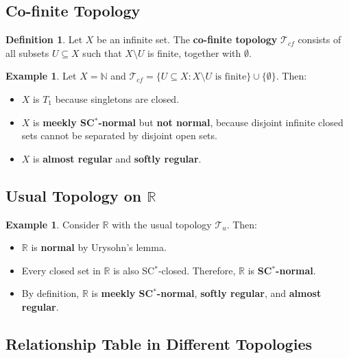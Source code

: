 \documentclass[12pt,a4paper,twoside]{report}  %
\theoremstyle{plain}
\theoremstyle{definition}
\newtheorem{definition}[theorem]{Definition}
\newtheorem{example}[theorem]{Example}
\begin{document}
\subsection{Co-finite Topology}

\begin{definition}
Let $X$ be an infinite set. The \textbf{co-finite topology}\cite{steen1978counterexamples,engelking1977general} $\mathcal{T}_{cf}$ consists of all subsets $U \subseteq X$ such that $X \setminus U$ is finite, together with $\emptyset$.
\end{definition}

\begin{example}
Let $X = \mathbb{N}$ and $\mathcal{T}_{cf} = \{ U \subseteq X : X \setminus U \text{ is finite} \} \cup \{\emptyset\}$. Then:
\begin{itemize}
    \item $X$ is $T_1$ because singletons are closed.
    \item $X$ is \textbf{meekly SC$^*$-normal} but \textbf{not normal}, because disjoint infinite closed sets cannot be separated by disjoint open sets.
    \item $X$ is \textbf{almost regular} and \textbf{softly regular}.
\end{itemize}
\end{example}

\subsection{Usual Topology on \texorpdfstring{$\mathbb{R}$}{R}}

\begin{example}
Consider $\mathbb{R}$ with the usual topology $\mathcal{T}_u$\cite{steen1978counterexamples,engelking1977general}. Then:
\begin{itemize}
    \item $\mathbb{R}$ is \textbf{normal} by Urysohn's lemma\cite{munkres2000topology}.
    \item Every closed set in $\mathbb{R}$ is also SC$^*$-closed. Therefore, $\mathbb{R}$ is \textbf{SC$^*$-normal}.
    \item By definition, $\mathbb{R}$ is \textbf{meekly SC$^*$-normal}, \textbf{softly regular}, and \textbf{almost regular}.
\end{itemize}
\end{example}

\subsection{Relationship Table in Different Topologies}
\end{document}
